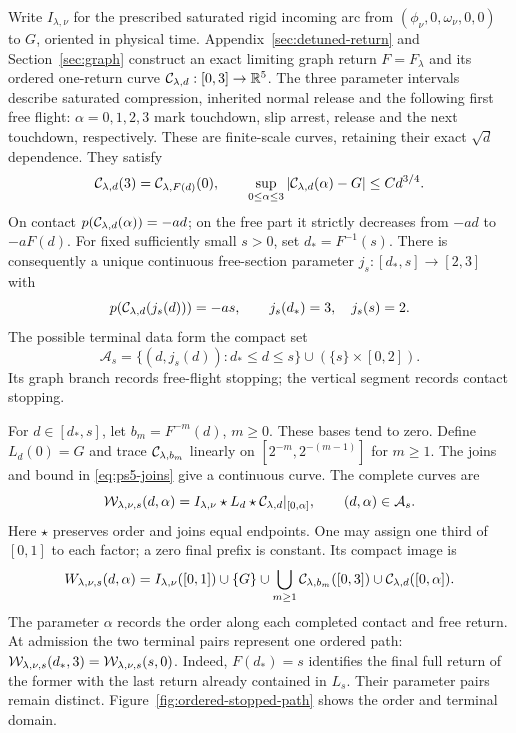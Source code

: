 Write $I_{\lambda,\nu}$ for the prescribed saturated rigid incoming
arc from $(\phi_\nu,0,\omega_\nu,0,0)$ to $G$, oriented in physical
time. Appendix~\ref{sec:detuned-return} and Section~\ref{sec:graph} construct an
exact limiting graph return $F=F_\lambda$ and its ordered one-return
curve $\mathcal C_{\lambda,d}:[0,3]\to\mathbb R^5$. The three parameter intervals
describe saturated compression, inherited normal release and the
following first free flight: $\alpha=0,1,2,3$ mark touchdown, slip
arrest, release and the next touchdown, respectively.
These are finite-scale curves, retaining
their exact $\sqrt d$ dependence. They satisfy
\begin{equation}
 \mathcal C_{\lambda,d}(3)=\mathcal C_{\lambda,F(d)}(0),\qquad
 \sup_{0\le\alpha\le3}|\mathcal C_{\lambda,d}(\alpha)-G|
                      \le C d^{3/4}.
 \label{eq:ps5-joins}
\end{equation}
On contact $p(\mathcal C_{\lambda,d}(\alpha))=-ad$; on the free part it
strictly decreases from $-ad$ to $-aF(d)$. For fixed sufficiently
small $s>0$, set $d_*=F^{-1}(s)$. There is consequently a unique
continuous free-section parameter $j_s:[d_*,s]\to[2,3]$ with
\begin{equation}
 p(\mathcal C_{\lambda,d}(j_s(d)))=-as,\qquad
 j_s(d_*)=3,\quad j_s(s)=2.
 \label{eq:path-free-section}
\end{equation}
The possible terminal data form the compact set
\begin{equation}
 \mathcal A_s=\{(d,j_s(d)):d_*\le d\le s\}
                       \cup(\{s\}\times[0,2]).
 \label{eq:ps5-domain}
\end{equation}
Its graph branch records free-flight stopping; the vertical segment
records contact stopping.

For $d\in[d_*,s]$, let $b_m=F^{-m}(d)$, $m\ge0$. These bases tend
to zero. Define $L_d(0)=G$ and trace $\mathcal C_{\lambda,b_m}$ linearly on
$[2^{-m},2^{-(m-1)}]$ for $m\ge1$. The joins and bound in
\eqref{eq:ps5-joins} give a continuous curve. The complete curves are
\begin{equation}
 \mathcal W_{\lambda,\nu,s}(d,\alpha)
   =I_{\lambda,\nu}\star L_d\star
                   \mathcal C_{\lambda,d}|_{[0,\alpha]},
       \qquad(d,\alpha)\in\mathcal A_s.
 \label{eq:ps5-whole}
\end{equation}
Here $\star$ preserves order and joins equal endpoints. One may assign
one third of $[0,1]$ to each factor; a zero final prefix is constant.
Its compact image is
\begin{equation}
 W_{\lambda,\nu,s}(d,\alpha)
  =I_{\lambda,\nu}([0,1])\cup\{G\}
    \cup\bigcup_{m\ge1}\mathcal C_{\lambda,b_m}([0,3])
    \cup\mathcal C_{\lambda,d}([0,\alpha]).
 \label{eq:ps5-whole-image}
\end{equation}
The parameter $\alpha$ records the order along each completed contact
and free return.
At admission the two terminal pairs represent one ordered path:
$\mathcal W_{\lambda,\nu,s}(d_*,3)=\mathcal W_{\lambda,\nu,s}(s,0)$.
Indeed, $F(d_*)=s$ identifies the final full return of the former
with the last return already contained in $L_s$. Their parameter
pairs remain distinct. Figure~\ref{fig:ordered-stopped-path} shows
the order and terminal domain.



